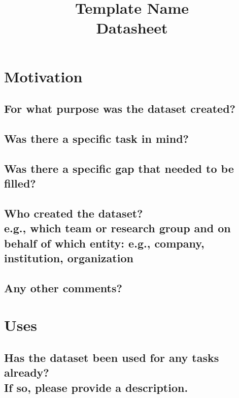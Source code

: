 \documentclass[letterpaper, 10 pt, conference]{ieeeconf}  %
\title{\LARGE \bf
Template Name \\{\color{blue}Datasheet}
}
\newcommand{\subtitle}[1]{{\\ \small \normalfont \color{purple} #1}}
\begin{document}
\maketitle
\thispagestyle{empty}
\pagestyle{empty}

\section{Motivation}

\subsection{For what purpose was the dataset created?}

\lipsum[1]

\subsection{Was there a specific task in mind?}

\lipsum[1]

\subsection{Was there a specific gap that needed to be filled?}

\lipsum[1]

\subsection{Who created the dataset? \subtitle{e.g., which team or research group and on behalf of which entity: e.g., company, institution, organization}}

\lipsum[1]

\subsection{Any other comments?}

\lipsum[1]

\section{Uses}

\subsection{Has the dataset been used for any tasks already? \subtitle{If so, please provide a description.}}
\end{document}
